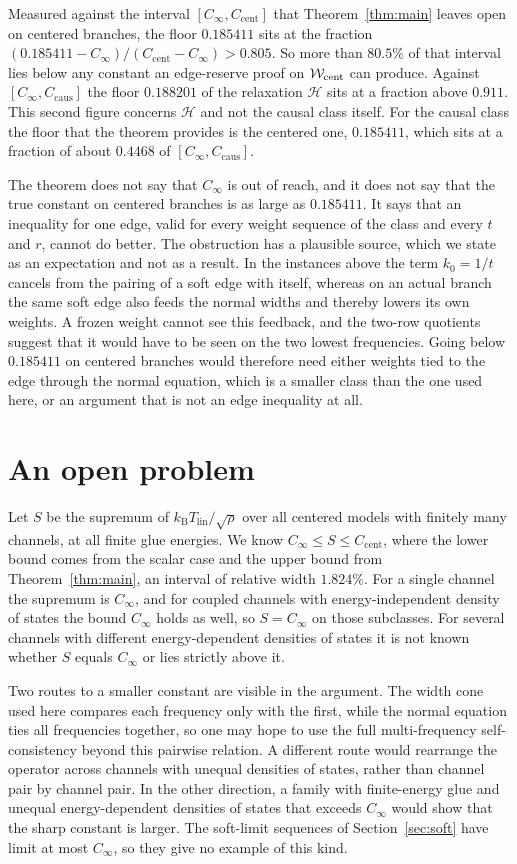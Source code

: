 \documentclass[10pt]{article}
\theoremstyle{remark}
\newcommand{\kB}{k_{\mathrm B}}
\newcommand{\Tlin}{T_{\mathrm{lin}}}
\newcommand{\Cinf}{C_\infty}
\newcommand{\Ccent}{C_{\mathrm{cent}}}
\newcommand{\Ccaus}{C_{\mathrm{caus}}}
\begin{document}
Measured against the interval $[\Cinf,\Ccent]$ that Theorem~\ref{thm:main} leaves open on centered branches, the floor $0.185411$ sits at the fraction $(0.185411-\Cinf)/(\Ccent-\Cinf)>0.805$. So more than $80.5\%$ of that interval lies below any constant an edge-reserve proof on $\mathcal W_{\rm cent}$ can produce. Against $[\Cinf,\Ccaus]$ the floor $0.188201$ of the relaxation $\mathcal H$ sits at a fraction above $0.911$. This second figure concerns $\mathcal H$ and not the causal class itself. For the causal class the floor that the theorem provides is the centered one, $0.185411$, which sits at a fraction of about $0.4468$ of $[\Cinf,\Ccaus]$.

The theorem does not say that $\Cinf$ is out of reach, and it does not say that the true constant on centered branches is as large as $0.185411$. It says that an inequality for one edge, valid for every weight sequence of the class and every $t$ and $r$, cannot do better. The obstruction has a plausible source, which we state as an expectation and not as a result. In the instances above the term $k_0=1/t$ cancels from the pairing of a soft edge with itself, whereas on an actual branch the same soft edge also feeds the normal widths and thereby lowers its own weights. A frozen weight cannot see this feedback, and the two-row quotients suggest that it would have to be seen on the two lowest frequencies. Going below $0.185411$ on centered branches would therefore need either weights tied to the edge through the normal equation, which is a smaller class than the one used here, or an argument that is not an edge inequality at all.

\section{An open problem}\label{sec:open}

Let $S$ be the supremum of $\kB\Tlin/\sqrt\rho$ over all centered models with finitely many channels, at all finite glue energies. We know $\Cinf\le S\le\Ccent$, where the lower bound comes from the scalar case and the upper bound from Theorem~\ref{thm:main}, an interval of relative width $1.824\%$. For a single channel the supremum is $\Cinf$, and for coupled channels with energy-independent density of states the bound $\Cinf$ holds as well, so $S=\Cinf$ on those subclasses. For several channels with different energy-dependent densities of states it is not known whether $S$ equals $\Cinf$ or lies strictly above it.

Two routes to a smaller constant are visible in the argument. The width cone used here compares each frequency only with the first, while the normal equation ties all frequencies together, so one may hope to use the full multi-frequency self-consistency beyond this pairwise relation. A different route would rearrange the operator across channels with unequal densities of states, rather than channel pair by channel pair. In the other direction, a family with finite-energy glue and unequal energy-dependent densities of states that exceeds $\Cinf$ would show that the sharp constant is larger. The soft-limit sequences of Section~\ref{sec:soft} have limit at most $\Cinf$, so they give no example of this kind.
\end{document}
